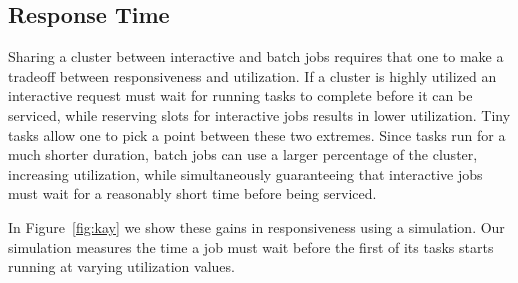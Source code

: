 \subsection{Response Time}
Sharing a cluster between interactive and batch jobs requires that one to make a
tradeoff between responsiveness and utilization. If a cluster is highly utilized
an interactive request must wait for running tasks to complete before it can be
serviced, while reserving slots for interactive jobs results in lower utilization. Tiny
tasks allow one to pick a point between these two extremes. Since tasks run for a much
shorter duration, batch jobs can use a larger percentage of the cluster, increasing
utilization, while simultaneously guaranteeing that interactive jobs must wait for 
a reasonably short time before being serviced.

In Figure~\ref{fig:kay} we show these gains in responsiveness using a simulation. Our
simulation measures the time a job must wait before the first of its tasks starts running
at varying utilization values.
